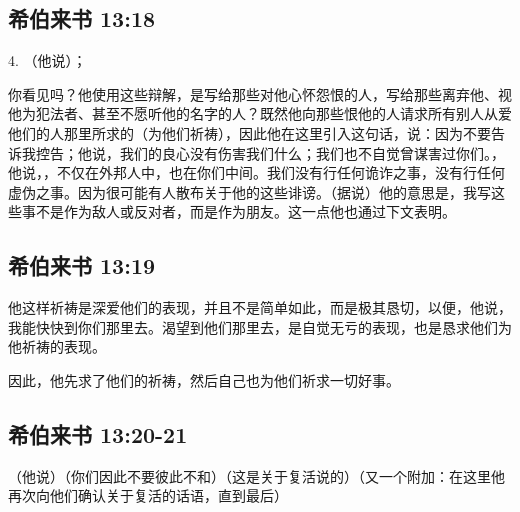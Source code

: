 
\subsection{希伯来书 13:18}

4. （他说）；\par

你看见吗？他使用这些辩解，是写给那些对他心怀怨恨的人，写给那些离弃他、视他为犯法者、甚至不愿听他的名字的人？既然他向那些恨他的人请求所有别人从爱他们的人那里所求的（为他们祈祷），因此他在这里引入这句话，说：因为不要告诉我控告；他说，我们的良心没有伤害我们什么；我们也不自觉曾谋害过你们。，他说，，不仅在外邦人中，也在你们中间。我们没有行任何诡诈之事，没有行任何虚伪之事。因为很可能有人散布关于他的这些诽谤。（据说）他的意思是，我写这些事不是作为敌人或反对者，而是作为朋友。这一点他也通过下文表明。\par


\subsection{希伯来书 13:19}

他这样祈祷是深爱他们的表现，并且不是简单如此，而是极其恳切，以便，他说，我能快快到你们那里去。渴望到他们那里去，是自觉无亏的表现，也是恳求他们为他祈祷的表现。\par

因此，他先求了他们的祈祷，然后自己也为他们祈求一切好事。\par


\subsection{希伯来书 13:20-21}

（他说）（你们因此不要彼此不和）（这是关于复活说的）（又一个附加：在这里他再次向他们确认关于复活的话语，直到最后） \par

